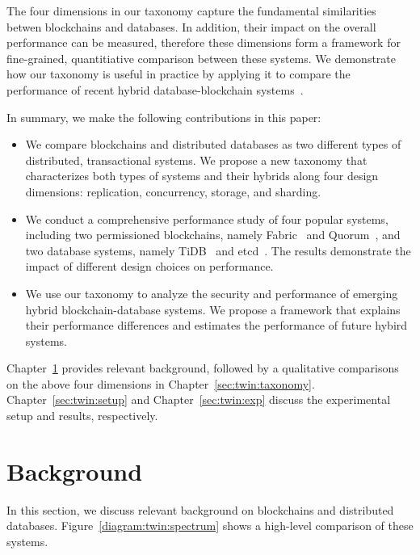 The four dimensions in our taxonomy capture the fundamental
similarities betwen blockchains and databases. In addition, their impact on the
overall performance can be measured, therefore these dimensions form a framework
for fine-grained, quantitiative comparison between these systems. We demonstrate
how our taxonomy is useful in practice by applying it to compare the performance
of recent hybrid database-blockchain
systems~\cite{BlockchainMeetsDatabase,peng2020falcondb,veritas,el2019blockchaindb,mcconaghy2016bigchaindb,schuhknecht2019chainifydb}.

In summary, we make the following contributions in this paper:
\begin{itemize}
  \item We compare blockchains and distributed databases as two different types
  of distributed, transactional systems. We propose a new taxonomy that
  characterizes both types of systems and their hybrids along four
  design dimensions: replication, concurrency, storage, and sharding.

  \item We conduct a comprehensive performance study of four popular systems,
  including two permissioned blockchains, namely Fabric~\cite{web:fabric} and
  Quorum~\cite{web:quorum}, and two database systems, namely
  TiDB~\cite{web:tidb} and etcd~\cite{web:etcd}. The results demonstrate the
  impact of different design choices on performance.
   
  \item We use our taxonomy to analyze the security and performance of emerging
  hybrid blockchain-database systems. We propose a framework that explains their
  performance differences and estimates the performance of future hybird
  systems.
\end{itemize}

Chapter~\ref{sec:twin:background} provides relevant background, followed by a qualitative comparisons on the above
four dimensions in Chapter~\ref{sec:twin:taxonomy}. Chapter~\ref{sec:twin:setup} and Chapter~\ref{sec:twin:exp} discuss the experimental setup and
results, respectively. 



\section{Background}
\label{sec:twin:background}

In this section, we discuss relevant background on blockchains and distributed databases.
Figure~\ref{diagram:twin:spectrum} shows a high-level comparison of these systems.

